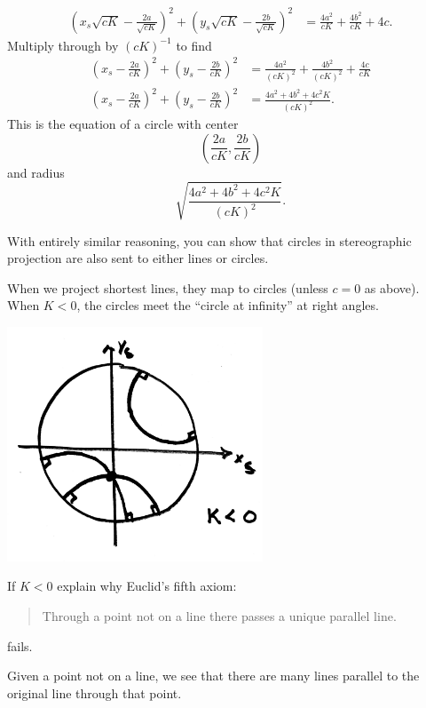 \documentclass{ximera}
\begin{document}
\begin{problem}
\begin{freeResponse}
\begin{align*}
  \left(x_s\sqrt{cK} - \frac{2a}{\sqrt{cK}}\right)^2 + \left(y_s\sqrt{cK} - \frac{2b}{\sqrt{cK}}\right)^2&=\frac{4a^2}{cK} + \frac{4b^2}{cK} + 4c.
  \end{align*}
  Multiply through by $(cK)^{-1}$ to find
  \begin{align*}
    \left(x_s - \frac{2a}{cK}\right)^2 + \left(y_s - \frac{2b}{cK}\right)^2 &= \frac{4a^2}{(cK)^2} + \frac{4b^2}{(cK)^2} + \frac{4c}{cK}\\
    \left(x_s - \frac{2a}{cK}\right)^2 + \left(y_s - \frac{2b}{cK}\right)^2 &= \frac{4a^2 + 4b^2 + 4c^2K}{(cK)^2}.
  \end{align*}
  This is the equation of a circle with center
  \[
  \left(\frac{2a}{cK}, \frac{2b}{cK}\right)
  \]
  and radius
  \[
  \sqrt{\frac{4a^2 + 4b^2 + 4c^2K}{(cK)^2}}.
  \]
\end{freeResponse}
\end{problem}



\begin{remark}
  With entirely similar reasoning, you can show that circles in
  stereographic projection are also sent to either lines or circles.
\end{remark}


When we project shortest lines, they map to circles (unless $c=0$ as
above). When $K<0$, the circles meet the ``circle at infinity'' at right angles. 

\begin{image}
\includegraphics[width=3in]{stereoLines.png}
\end{image}

\begin{problem}
  If $K<0$ explain why Euclid's fifth axiom:
  \begin{quote}
    Through a point not on a line there passes a unique parallel line.
  \end{quote}
  fails.
  \begin{freeResponse}
    Given a point not on a line, we see that there are many lines
    parallel to the original line through that point.
  \end{freeResponse}
\end{problem}
\end{document}
